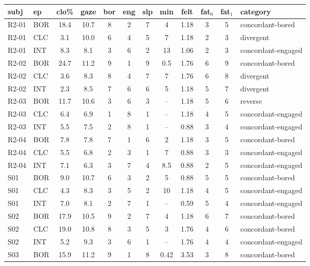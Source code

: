 \begin{tabular}{llcccccccccl}
\hline
subj & ep & clo\% & gaze & bor & eng & slp & min & felt & fat$_0$ & fat$_1$ & category \\
\hline
R2-01 & BOR & 18.4 & 10.7 & 8 & 2 & 7 & 4 & 1.18 & 3 & 5 & concordant-bored \\
R2-01 & CLC & 3.1 & 10.0 & 6 & 4 & 5 & 7 & 1.18 & 2 & 3 & divergent \\
R2-01 & INT & 8.3 & 8.1 & 3 & 6 & 2 & 13 & 1.06 & 2 & 3 & concordant-engaged \\
R2-02 & BOR & 24.7 & 11.2 & 9 & 1 & 9 & 0.5 & 1.76 & 6 & 9 & concordant-bored \\
R2-02 & CLC & 3.6 & 8.3 & 8 & 4 & 7 & 7 & 1.76 & 6 & 8 & divergent \\
R2-02 & INT & 2.3 & 8.5 & 7 & 6 & 6 & 5 & 1.18 & 5 & 7 & divergent \\
R2-03 & BOR & 11.7 & 10.6 & 3 & 6 & 3 & -- & 1.18 & 5 & 6 & reverse \\
R2-03 & CLC & 6.4 & 6.9 & 1 & 8 & 1 & -- & 1.18 & 4 & 5 & concordant-engaged \\
R2-03 & INT & 5.5 & 7.5 & 2 & 8 & 1 & -- & 0.88 & 3 & 4 & concordant-engaged \\
R2-04 & BOR & 7.8 & 7.8 & 7 & 1 & 6 & 2 & 1.18 & 3 & 5 & concordant-bored \\
R2-04 & CLC & 5.5 & 6.8 & 2 & 3 & 1 & 7 & 0.88 & 3 & 3 & concordant-engaged \\
R2-04 & INT & 7.1 & 6.3 & 3 & 7 & 4 & 8.5 & 0.88 & 2 & 5 & concordant-engaged \\
S01 & BOR & 9.0 & 10.7 & 6 & 3 & 2 & 5 & 0.88 & 5 & 5 & concordant-bored \\
S01 & CLC & 4.3 & 8.3 & 3 & 5 & 2 & 10 & 1.18 & 4 & 5 & concordant-engaged \\
S01 & INT & 7.0 & 8.1 & 2 & 7 & 1 & -- & 0.59 & 5 & 4 & concordant-engaged \\
S02 & BOR & 17.9 & 10.5 & 9 & 2 & 7 & 4 & 1.18 & 6 & 7 & concordant-bored \\
S02 & CLC & 19.0 & 10.8 & 8 & 3 & 5 & 3 & 1.76 & 4 & 6 & concordant-bored \\
S02 & INT & 5.2 & 9.3 & 3 & 6 & 1 & -- & 1.76 & 4 & 4 & concordant-engaged \\
S03 & BOR & 15.9 & 11.2 & 9 & 1 & 8 & 0.42 & 3.53 & 3 & 8 & concordant-bored \\

\end{tabular}
